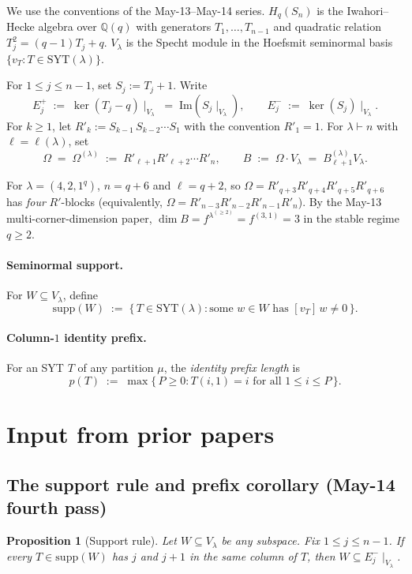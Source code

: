 \documentclass[11pt]{article}
\newtheorem{proposition}[theorem]{Proposition}
\theoremstyle{definition}
\newcommand{\Hq}{H_q}
\newcommand{\Sn}{S_n}
\newcommand{\Vlam}{V_\lambda}
\newcommand{\Bdec}{B_{\ell+1}^{(\lambda)}}
\newcommand{\Om}{\Omega}
\newcommand{\supp}{\mathrm{supp}}
\newcommand{\SYT}{\mathrm{SYT}}
\begin{document}
We use the conventions of the May-13--May-14 series.  $\Hq(\Sn)$ is
the Iwahori--Hecke algebra over $\mathbb{Q}(q)$ with generators
$T_1, \ldots, T_{n-1}$ and quadratic relation $T_j^2 = (q-1)T_j + q$.
$\Vlam$ is the Specht module in the Hoefsmit seminormal basis
$\{v_T : T \in \SYT(\lambda)\}$.

For $1 \le j \le n-1$, set $S_j := T_j + 1$.  Write
\[
   E_j^+ \;:=\; \ker(T_j - q)\!\mid_{\Vlam}
   \;=\; \mathrm{Im}(S_j\!\mid_{\Vlam}),
   \qquad
   E_j^- \;:=\; \ker(S_j)\!\mid_{\Vlam}.
\]
For $k \ge 1$, let $R'_k := S_{k-1}\,S_{k-2}\cdots S_1$ with the
convention $R'_1 = 1$.  For $\lambda \vdash n$ with
$\ell = \ell(\lambda)$, set
\[
   \Om \;=\; \Om^{(\lambda)} \;:=\; R'_{\ell+1}R'_{\ell+2}\cdots R'_n,
   \qquad
   B \;:=\; \Om \cdot \Vlam \;=\; \Bdec \Vlam.
\]

For $\lambda = (4, 2, 1^q)$, $n = q + 6$ and $\ell = q + 2$, so
$\Om = R'_{q+3}R'_{q+4}R'_{q+5}R'_{q+6}$ has \emph{four} $R'$-blocks
(equivalently, $\Om = R'_{n-3}R'_{n-2}R'_{n-1}R'_n$).  By the
May-13 multi-corner-dimension paper, $\dim B = f^{\lambda^{(\ge 2)}}
= f^{(3, 1)} = 3$ in the stable regime $q \ge 2$.

\paragraph{Seminormal support.}  For $W \subseteq V_\lambda$, define
\[
   \supp(W) \;:=\; \{\,T \in \SYT(\lambda) : \text{some } w \in W
   \text{ has } [v_T]\,w \ne 0\,\}.
\]

\paragraph{Column-$1$ identity prefix.}  For an SYT $T$ of any
partition $\mu$, the \emph{identity prefix length} is
\[
   p(T) \;:=\; \max\{\,P \ge 0 : T(i, 1) = i \text{ for all }
   1 \le i \le P\,\}.
\]

\section{Input from prior papers}\label{sec:input}

\subsection{The support rule and prefix corollary (May-14 fourth pass)}

\begin{proposition}[Support rule]\label{prop:support-rule}
Let $W \subseteq V_\lambda$ be any subspace.  Fix $1 \le j \le n-1$.
If every $T \in \supp(W)$ has $j$ and $j+1$ in the same column of
$T$, then $W \subseteq E_j^-\!\mid_{V_\lambda}$.
\end{proposition}
\end{document}
